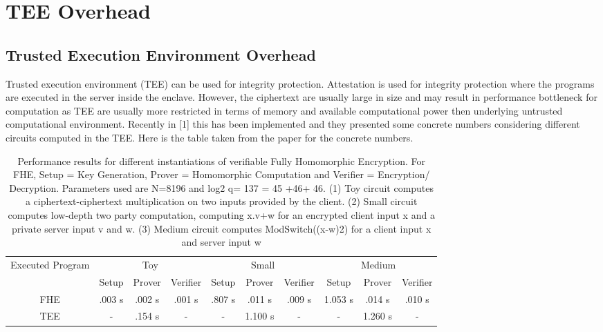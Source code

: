 
\chapter{TEE Overhead}
\setcounter{section}{0}

\section{Trusted Execution Environment Overhead}
Trusted execution environment (TEE) can be used for integrity protection. Attestation is used for integrity protection where the programs are executed in the server inside the enclave. However, the ciphertext are usually large in size and may result in performance bottleneck for computation as TEE are usually more restricted in terms of memory and available computational power then underlying untrusted computational environment. Recently in [1] this has been implemented and they presented some concrete numbers considering different circuits computed in the TEE. Here is the table taken from the paper \cite{viand2023verifiable} for the concrete numbers.


\begin{table}
    \begin{tabular}{|c|c|c|c | c|c|c | c|c|c| }
        \hline
        \multirow{2}{*}{Executed Program} & \multicolumn{3}{|c|}{Toy} & \multicolumn{3}{|c|}{Small} & \multicolumn{3}{|c|}{Medium}                                                              \\
                                          & Setup                     & Prover                      & Verifier                     & Setup  & Prover  & Verifier & Setup   & Prover  & Verifier \\
        \hline
        FHE                               & .003 s                    & .002 s                      & .001 s                       & .807 s & .011 s  & .009 s   & 1.053 s & .014 s  & .010 s   \\
        \hline
        TEE                               & -                         & .154 s                      & -                            & -      & 1.100 s & -        & -       & 1.260 s & -        \\
        \hline
    \end{tabular}
    \caption{Performance results for different instantiations of verifiable Fully Homomorphic Encryption. For FHE, Setup = Key Generation, Prover = Homomorphic Computation and Verifier = Encryption/ Decryption. Parameters used are N=8196 and log2 q= 137 = 45 +46+ 46. (1) Toy circuit computes a ciphertext-ciphertext multiplication on two inputs provided by the client. (2) Small circuit computes low-depth two party computation, computing x.v+w for an encrypted client input x and a private server input v and w. (3) Medium circuit computes  ModSwitch((x-w)2) for a client input x and server input w}
    \label{tab1}
\end{table}

